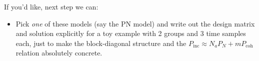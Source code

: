 \documentclass[11pt]{article}
\begin{document}
If you’d like, next step we can:

\begin{itemize}[leftmargin=*]
  \item Pick \emph{one} of these models (say the PN model) and write out the design matrix and solution explicitly for a toy example with 2 groups and 3 time samples each, just to make the block-diagonal structure and the $P_{\mathrm{inc}} \approx N_a P_N + m P_{\mathrm{coh}}$ relation absolutely concrete.
\end{itemize}
\end{document}
